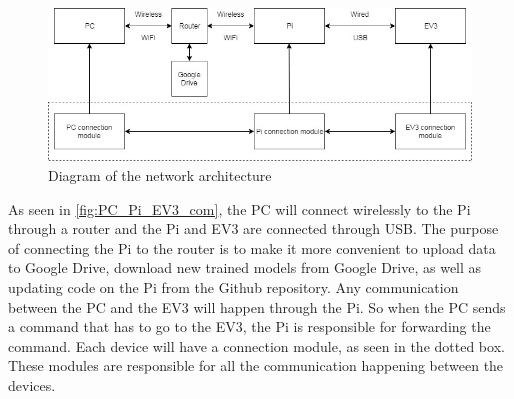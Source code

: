 \begin{figure} [H]
    \centering
    \includegraphics[width=\textwidth]{images/design/Pc_Pi_EV3_Connection.jpg}
    \caption{Diagram of the network architecture}
    \label{fig:PC_Pi_EV3_com}
\end{figure}

As seen in \autoref{fig:PC_Pi_EV3_com}, the PC will connect wirelessly to the Pi through a router and the Pi and EV3 are connected through USB.
The purpose of connecting the Pi to the router is to make it more convenient to upload data to Google Drive, download new trained models from Google Drive, as well as updating code on the Pi from the Github repository.
Any communication between the PC and the EV3 will happen through the Pi.
So when the PC sends a command that has to go to the EV3, the Pi is responsible for forwarding the command.
Each device will have a connection module, as seen in the dotted box.
These modules are responsible for all the communication happening between the devices.
